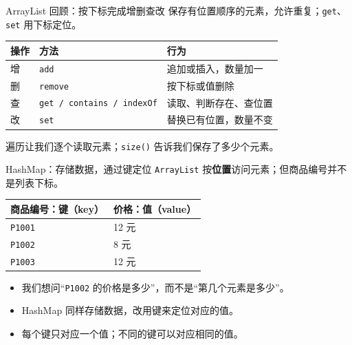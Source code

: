 \documentclass[aspectratio=169]{beamer}
\begin{document}
\begin{frame}{ArrayList 回顾：按下标完成增删查改}
  保存有位置顺序的元素，允许重复；\texttt{get}、\texttt{set} 用下标定位。
  \par\bigskip
  \begin{center}
    \renewcommand{\arraystretch}{1.4}
    \begin{tabular}{lll}
      \textbf{操作} & \textbf{方法} & \textbf{行为} \\
      \hline
      增 & \texttt{add} & 追加或插入，数量加一 \\
      删 & \texttt{remove} & 按下标或值删除 \\
      查 & \texttt{get / contains / indexOf} & 读取、判断存在、查位置 \\
      改 & \texttt{set} & 替换已有位置，数量不变 \\
    \end{tabular}
  \end{center}
  \bigskip
  遍历让我们逐个读取元素；\texttt{size()} 告诉我们保存了多少个元素。
\end{frame}

\begin{frame}{HashMap：存储数据，通过键定位}
  \texttt{ArrayList} 按\textbf{位置}访问元素；但商品编号并不是列表下标。
  \par\bigskip
  \begin{center}
    \renewcommand{\arraystretch}{1.3}
    \begin{tabular}{ll}
      \textbf{商品编号：键（key）} & \textbf{价格：值（value）} \\
      \hline
      \texttt{P1001} & 12 元 \\
      \texttt{P1002} & 8 元 \\
      \texttt{P1003} & 12 元 \\
    \end{tabular}
  \end{center}
  \medskip
  \begin{itemize}
    \item 我们想问“\texttt{P1002} 的价格是多少”，而不是“第几个元素是多少”。
    \item \alert{HashMap} 同样存储数据，改用键来定位对应的值。
    \item 每个键只对应一个值；不同的键可以对应相同的值。
  \end{itemize}
\end{frame}
\end{document}
